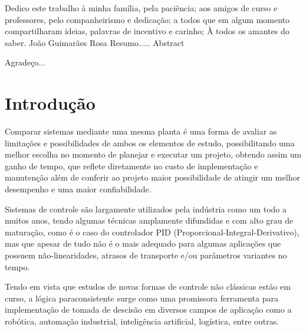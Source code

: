 \documentclass[12pt,a4paper]{report}
\begin{document}
\capa
\folhaderosto
\fichacatalografica
\folhadeaprovacao
\dedicatoria
{
      Dedico este trabalho à minha família, 
      pela paciência;
      aos amigos de curso e professores, 
      pelo companheirismo e dedicação;
      a todos que em algum momento compartilharam 
      ideias, palavras de incentivo e carinho;
      À todos os amantes do saber.
}
{ João Guimarães Rosa }
\resumo
{
Resumo.....
}
\resumolinguaestrangeira
{
Abstract
}

\agradecimentos
{
Agradeço...
}

\sumario

\listadefiguras

\listadetabelas

\onehalfspacing		%

\chapter{Introdução}
Comparar sistemas mediante uma mesma planta é uma forma de avaliar as limitações e possibilidades de ambos os elementos de estudo, possibilitando uma melhor escolha no momento de planejar e executar um projeto, obtendo assim um ganho de tempo, que reflete diretamente no custo de implementação e manutenção além de conferir ao projeto maior possibilidade de atingir um melhor desempenho e uma maior confiabilidade. 

Sistemas de controle são largamente utilizados pela indústria como um todo a muitos anos, tendo algumas técnicas amplamente difundidas e com alto grau de maturação, como é o caso do controlador PID (Proporcional-Integral-Derivativo), mas que apesar de tudo não é o mais adequado para algumas aplicações que possuem não-linearidades, atrasos de transporte e/ou parâmetros variantes no tempo.\cite{Ferreira2012}



Tendo em vista que estudos de novas formas de controle não clássicas estão em curso, a lógica paraconsistente surge como uma promissora ferramenta para implementação de tomada de descisão em diversos campos de aplicação como a robótica, automação industrial, inteligência artificial, logística, entre outras.\cite{JoaoInacio}
 
\end{document}
